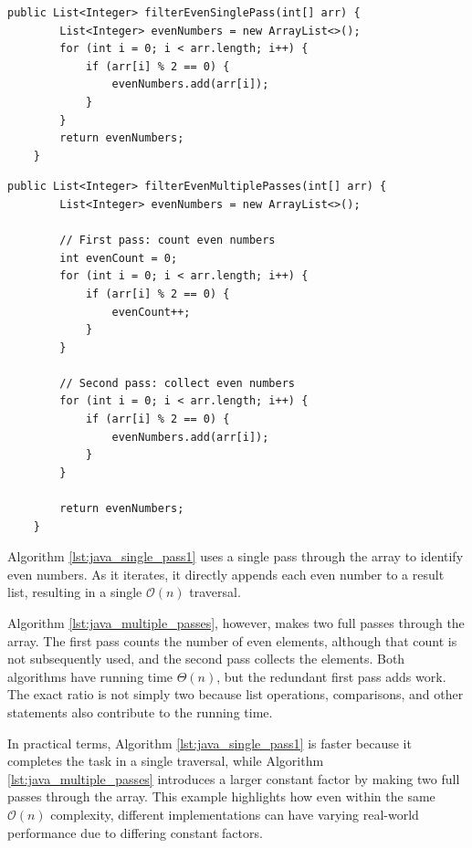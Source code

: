 \begin{lstlisting}[style=javaStyle, caption={Single pass to filter even numbers}, label={lst:java_single_pass1}]
    public List<Integer> filterEvenSinglePass(int[] arr) {
        List<Integer> evenNumbers = new ArrayList<>();
        for (int i = 0; i < arr.length; i++) {
            if (arr[i] % 2 == 0) {
                evenNumbers.add(arr[i]);
            }
        }
        return evenNumbers;
    }
\end{lstlisting}

\newpage

\begin{lstlisting}[style=javaStyle, caption={Multiple passes to filter even numbers}, label={lst:java_multiple_passes}]
    public List<Integer> filterEvenMultiplePasses(int[] arr) {
        List<Integer> evenNumbers = new ArrayList<>();

        // First pass: count even numbers
        int evenCount = 0;
        for (int i = 0; i < arr.length; i++) {
            if (arr[i] % 2 == 0) {
                evenCount++;
            }
        }

        // Second pass: collect even numbers
        for (int i = 0; i < arr.length; i++) {
            if (arr[i] % 2 == 0) {
                evenNumbers.add(arr[i]);
            }
        }

        return evenNumbers;
    }
\end{lstlisting}

Algorithm \ref{lst:java_single_pass1} uses a single pass through the array to identify even numbers. As it iterates, it directly appends each even number to a result list, resulting in a single $\mathcal{O}(n)$ traversal.

Algorithm \ref{lst:java_multiple_passes}, however, makes two full passes through the array. The first pass counts the number of even elements, although that count is not subsequently used, and the second pass collects the elements. Both algorithms have running time $\Theta(n)$, but the redundant first pass adds work. The exact ratio is not simply two because list operations, comparisons, and other statements also contribute to the running time.

In practical terms, Algorithm \ref{lst:java_single_pass1} is faster because it completes the task in a single traversal, while Algorithm \ref{lst:java_multiple_passes} introduces a larger constant factor by making two full passes through the array. This example highlights how even within the same $\mathcal{O}(n)$ complexity, different implementations can have varying real-world performance due to differing constant factors.

